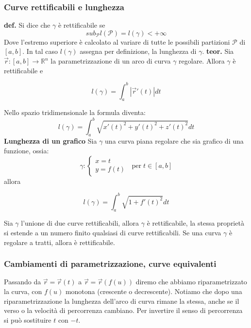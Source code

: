 \subsubsection{Curve rettificabili e lunghezza}
\textbf{def.} Si dice che $\gamma$ è rettificabile se 
\[
    sub_\mathcal{P} l(\mathcal{P}) = l(\gamma) < + \infty
\]
Dove l'estremo superiore è calcolato al variare di tutte le possibili partizioni $\mathcal{P}$ di $[a,b]$.\newline
In tal caso $l(\gamma)$ assegna per definizione, la lunghezza di $\gamma$.\newline
\newline
\textbf{teor.} Sia $\vec{r}:[a,b] \rightarrow \mathbb{R}^n$ la parametrizzazione di un arco di curva $\gamma$ regolare. Allora $\gamma$ è rettificabile e 
\begin{tcolorbox}
\[
    l(\gamma) = \int_{a}^{b}|\vec{r}'(t)| dt
\]
\end{tcolorbox}
Nello spazio tridimensionale la formula diventa:
\[
    l(\gamma)= \int_{a}^{b}\sqrt{x'(t)^2 + y'(t)^2 + z'(t)^2}dt
\]
\textbf{Lunghezza di un grafico}\newline
Sia $\gamma$ una curva piana regolare che sia grafico di una funzione, ossia:
\[
    \gamma : \begin{cases}
        x =t \\
        y= f(t)
    \end{cases} \;\; \text{per} \;t \in[a,b]
\]
allora
\begin{tcolorbox}
\[
    l(\gamma) = \int_{a}^{b}\sqrt{1+f'(t)^2}dt
\]
\end{tcolorbox}
Sia $\gamma$ l'unione di due curve rettificabili, allora $\gamma$ è rettificabile, la stessa proprietà si estende a un numero finito qualsiasi di curve rettificabili. \newline
\newline
Se una curva $\gamma$ è regolare a tratti, allora è rettificabile.\newline
\subsubsection{Cambiamenti di parametrizzazione, curve equivalenti}
Passando da $\vec{r} = \vec{r} (t)$ a $\vec{r} = \vec{r} (f(u))$ diremo che abbiamo riparametrizzato la curva, con $f(u)$ monotona (crescente o decrescente).\newline
Notiamo che dopo una riparametrizzazione la lunghezza dell'arco di curva rimane la stessa, anche se il verso o la velocità di percorrenza cambiano.\newline
Per invertire il senso di percorrenza si può sostituire $t$ con $-t$.\newline
